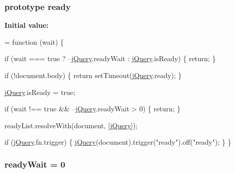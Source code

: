 \subsubsection[{\texorpdfstring{ready}{ready}}]{ {\bf prototype} ready}\hypertarget{jquery-2_82_81-vsdoc_8js_afcf7497803a32ea161cd2c7c5345c0ec}{}\label{jquery-2_82_81-vsdoc_8js_afcf7497803a32ea161cd2c7c5345c0ec}
{\bfseries Initial value\+:}
\begin{DoxyCode}
= \textcolor{keyword}{function} (wait) \{


        
        \textcolor{keywordflow}{if} (wait === \textcolor{keyword}{true} ? --\hyperlink{jquery-2_82_81-vsdoc_8js_add5237586d970a38a81f990e8eb28c6c}{jQuery}.readyWait : \hyperlink{jquery-2_82_81-vsdoc_8js_add5237586d970a38a81f990e8eb28c6c}{jQuery}.isReady) \{
            \textcolor{keywordflow}{return};
        \}

        
        \textcolor{keywordflow}{if} (!document.body) \{
            \textcolor{keywordflow}{return} setTimeout(\hyperlink{jquery-2_82_81-vsdoc_8js_add5237586d970a38a81f990e8eb28c6c}{jQuery}.ready);
        \}

        
        \hyperlink{jquery-2_82_81-vsdoc_8js_add5237586d970a38a81f990e8eb28c6c}{jQuery}.isReady = \textcolor{keyword}{true};

        
        \textcolor{keywordflow}{if} (wait !== \textcolor{keyword}{true} && --\hyperlink{jquery-2_82_81-vsdoc_8js_add5237586d970a38a81f990e8eb28c6c}{jQuery}.readyWait > 0) \{
            \textcolor{keywordflow}{return};
        \}

        
        readyList.resolveWith(document, [\hyperlink{jquery-2_82_81-vsdoc_8js_add5237586d970a38a81f990e8eb28c6c}{jQuery}]);

        
        \textcolor{keywordflow}{if} (\hyperlink{jquery-2_82_81-vsdoc_8js_add5237586d970a38a81f990e8eb28c6c}{jQuery}.fn.trigger) \{
            \hyperlink{jquery-2_82_81-vsdoc_8js_add5237586d970a38a81f990e8eb28c6c}{jQuery}(document).trigger(\textcolor{stringliteral}{"ready"}).off(\textcolor{stringliteral}{"ready"});
        \}
    \}
\end{DoxyCode}
\subsubsection[{\texorpdfstring{ready\+Wait}{readyWait}}]{ ready\+Wait = 0}\hypertarget{jquery-2_82_81-vsdoc_8js_aeb394066cf5f3ce501b86e49d9f68da7}{}\label{jquery-2_82_81-vsdoc_8js_aeb394066cf5f3ce501b86e49d9f68da7}
